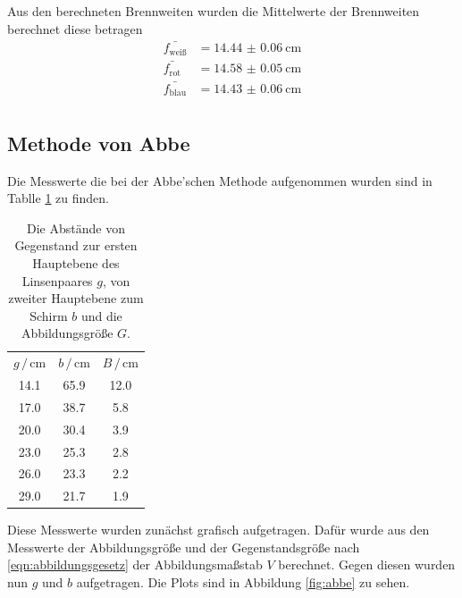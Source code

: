 Aus den berechneten Brennweiten wurden die Mittelwerte der Brennweiten berechnet diese betragen
\begin{align*}
    \bar{f_\text{weiß}} & =  \SI{14.44(6)}{\centi\meter} \\
    \bar{f_\text{rot}}  & =  \SI{14.58(5)}{\centi\meter} \\
    \bar{f_\text{blau}} & =   \SI{14.43(6)}{\centi\meter} \\
\end{align*}


\subsection{Methode von Abbe}

Die Messwerte die bei der Abbe'schen Methode aufgenommen wurden sind in Tablle \ref{tab:abbe} zu finden.
\begin{table}
    \centering
    \begin{tabular}{ccc}
        \toprule
        $g \,/\, \si{\centi\meter} $&$ b\,/\, \si{\centi\meter} $&$ B \,/\, \si{\centi\meter} $\\
        14.1 & 65.9 & 12.0   \\
        17.0 & 38.7 & 5.8 \\
        20.0 & 30.4 & 3.9 \\
        23.0 & 25.3 & 2.8 \\
        26.0 & 23.3 & 2.2 \\
        29.0 & 21.7 & 1.9 \\
    \end{tabular}
    \caption{Die Abstände von Gegenstand zur ersten Hauptebene des Linsenpaares $g$, von zweiter Hauptebene zum Schirm $b$ und die Abbildungsgröße $G$.}
    \label{tab:abbe}
\end{table}

Diese Messwerte wurden zunächst grafisch aufgetragen.
Dafür wurde aus den Messwerte der Abbildungsgröße und der Gegenstandsgröße nach \eqref{eqn:abbildungsgesetz} der Abbildungsmaßstab $V$ berechnet.
Gegen diesen wurden nun $g$ und $b$ aufgetragen. 
Die Plots sind in Abbildung \ref{fig:abbe} zu sehen.

